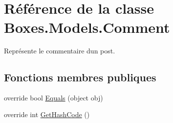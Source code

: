 \hypertarget{class_boxes_1_1_models_1_1_comment}{}\section{Référence de la classe Boxes.\+Models.\+Comment}
\label{class_boxes_1_1_models_1_1_comment}


Représente le commentaire d\textquotesingle{}un post.  


\subsection*{Fonctions membres publiques}
\begin{DoxyCompactItemize}
\item 
override bool \hyperlink{class_boxes_1_1_models_1_1_comment_a0360a591a8162f01a1b63022d150137f}{Equals} (object obj)
\item 
override int \hyperlink{class_boxes_1_1_models_1_1_comment_a99d5e1930e8faae64ddb98ffde4b3521}{Get\+Hash\+Code} ()
\end{DoxyCompactItemize}
